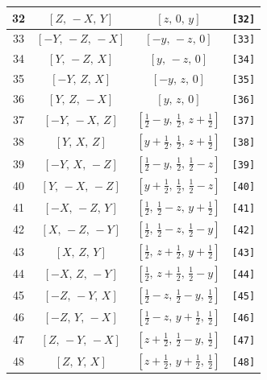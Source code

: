 \documentclass[fleqn,8pt]{jsarticle}
\begin{document}
\begin{longtable}{cccc}
32 & $\left[ Z,\, - X,\, Y \right]$ & $\left[ z,\, 0,\, y \right]$ & {\tt [32]} \\ \hline
33 & $\left[ - Y,\, - Z,\, - X \right]$ & $\left[ - y,\, - z,\, 0 \right]$ & {\tt [33]} \\ \hline
34 & $\left[ Y,\, - Z,\, X \right]$ & $\left[ y,\, - z,\, 0 \right]$ & {\tt [34]} \\ \hline
35 & $\left[ - Y,\, Z,\, X \right]$ & $\left[ - y,\, z,\, 0 \right]$ & {\tt [35]} \\ \hline
36 & $\left[ Y,\, Z,\, - X \right]$ & $\left[ y,\, z,\, 0 \right]$ & {\tt [36]} \\ \hline
37 & $\left[ - Y,\, - X,\, Z \right]$ & $\left[ \frac{1}{2} - y,\, \frac{1}{2},\, z + \frac{1}{2} \right]$ & {\tt [37]} \\ \hline
38 & $\left[ Y,\, X,\, Z \right]$ & $\left[ y + \frac{1}{2},\, \frac{1}{2},\, z + \frac{1}{2} \right]$ & {\tt [38]} \\ \hline
39 & $\left[ - Y,\, X,\, - Z \right]$ & $\left[ \frac{1}{2} - y,\, \frac{1}{2},\, \frac{1}{2} - z \right]$ & {\tt [39]} \\ \hline
40 & $\left[ Y,\, - X,\, - Z \right]$ & $\left[ y + \frac{1}{2},\, \frac{1}{2},\, \frac{1}{2} - z \right]$ & {\tt [40]} \\ \hline
41 & $\left[ - X,\, - Z,\, Y \right]$ & $\left[ \frac{1}{2},\, \frac{1}{2} - z,\, y + \frac{1}{2} \right]$ & {\tt [41]} \\ \hline
42 & $\left[ X,\, - Z,\, - Y \right]$ & $\left[ \frac{1}{2},\, \frac{1}{2} - z,\, \frac{1}{2} - y \right]$ & {\tt [42]} \\ \hline
43 & $\left[ X,\, Z,\, Y \right]$ & $\left[ \frac{1}{2},\, z + \frac{1}{2},\, y + \frac{1}{2} \right]$ & {\tt [43]} \\ \hline
44 & $\left[ - X,\, Z,\, - Y \right]$ & $\left[ \frac{1}{2},\, z + \frac{1}{2},\, \frac{1}{2} - y \right]$ & {\tt [44]} \\ \hline
45 & $\left[ - Z,\, - Y,\, X \right]$ & $\left[ \frac{1}{2} - z,\, \frac{1}{2} - y,\, \frac{1}{2} \right]$ & {\tt [45]} \\ \hline
46 & $\left[ - Z,\, Y,\, - X \right]$ & $\left[ \frac{1}{2} - z,\, y + \frac{1}{2},\, \frac{1}{2} \right]$ & {\tt [46]} \\ \hline
47 & $\left[ Z,\, - Y,\, - X \right]$ & $\left[ z + \frac{1}{2},\, \frac{1}{2} - y,\, \frac{1}{2} \right]$ & {\tt [47]} \\ \hline
48 & $\left[ Z,\, Y,\, X \right]$ & $\left[ z + \frac{1}{2},\, y + \frac{1}{2},\, \frac{1}{2} \right]$ & {\tt [48]} \\
\end{longtable}
\end{document}
